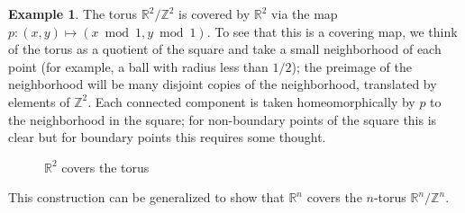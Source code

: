 \documentclass{article}
\theoremstyle{definition}
\newtheorem{exa}[thm]{Example}
\theoremstyle{remark}
\newcommand{\Z}{\mathbb Z}
\newcommand{\R}{\mathbb R}
\numberwithin{figure}{section}
\begin{document}
\begin{exa}
	The torus $\R^2/\Z^2$ is covered by $\R^2$ via the map $p : (x, y) \mapsto (x \bmod{1}, y \bmod{1})$. To see that this is a covering map, we think of the torus as a quotient of the square and take a small neighborhood of each point (for example, a ball with radius less than $1/2$); the preimage of the neighborhood will be many disjoint copies of the neighborhood, translated by elements of $\Z^2$. Each connected component is taken homeomorphically by $p$ to the neighborhood in the square; for non-boundary points of the square this is clear but for boundary points this requires some thought.
	
	\begin{figure}[h]
		\centering
		\caption{$\R^2$ covers the torus}
		\label{fig:R2 cover torus}
	\end{figure}
	
	This construction can be generalized to show that $\R^n$ covers the $n$-torus $\R^n/\Z^n$.
\end{exa}
\end{document}
